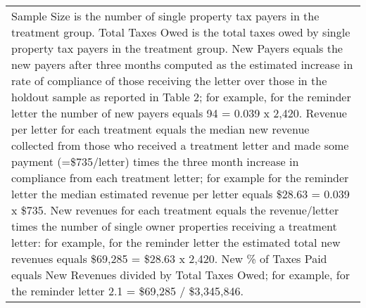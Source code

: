\begin{table}[htbp]
\begin{tabular}{lcccccc}
\multicolumn{7}{p{1\textwidth}}{\scriptsize* Sample Size is the number of single property tax payers in the treatment group.  Total Taxes Owed is the total taxes owed by single property tax payers in the treatment group. New Payers equals the new payers after three months computed as the estimated increase in rate of compliance of those receiving the letter over those in the holdout sample as reported in Table 2; for example, for the reminder letter the number of new payers equals 94 = 0.039 x 2,420.  Revenue per letter for each treatment equals the median new revenue collected from those who received a treatment letter and made some payment (=\$735/letter) times the three month increase in compliance from each treatment letter; for example for the reminder letter the median estimated revenue per letter equals \$28.63 = 0.039 x \$735.  New revenues for each treatment equals the revenue/letter times the number of single owner properties receiving a treatment letter: for example, for the reminder letter the estimated total new revenues equals \$69,285 = \$28.63 x 2,420.  New \% of Taxes Paid equals New Revenues divided by Total Taxes Owed; for example, for the reminder letter 2.1 = \$69,285 / \$3,345,846.}
  \end{tabular}
\end{table}
